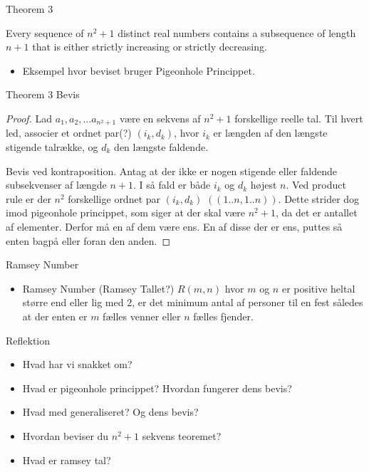\documentclass{beamer}
\begin{document}
\begin{frame}{Theorem 3}
   \begin{theorem}
       Every sequence of $n^2 + 1$ distinct real numbers contains a subsequence of length $n+1$ that is either strictly increasing or strictly decreasing. 
   \end{theorem} 
   \begin{itemize}
       \item Eksempel hvor beviset bruger Pigeonhole Princippet.
   \end{itemize}
\end{frame}

\begin{frame}{Theorem 3 Bevis}
   \begin{proof}
       Lad $a_1, a_2, \ldots a_{n^2+1}$ være en sekvens af $n^2 + 1$ forskellige reelle tal. Til hvert led, associer et ordnet par(?) $(i_k, d_k)$, hvor $i_k$ er længden af den længste stigende talrække, og $d_k$ den længste faldende. 

       Bevis ved kontraposition. Antag at der ikke er nogen stigende eller faldende subsekvenser af længde $n+1$. I så fald er både $i_k$ og $d_k$ højest $n$. Ved product rule er der $n^2$ forskellige ordnet par $(i_k, d_k)$ $((1..n, 1..n))$. Dette strider dog imod pigeonhole princippet, som siger at der skal være $n^2 + 1$, da det er antallet af elementer. Derfor må en af dem være ens. En af disse der er ens, puttes så enten bagpå eller foran den anden. 
   \end{proof} 
\end{frame}

\begin{frame}{Ramsey Number}
    \begin{itemize}
        \item Ramsey Number (Ramsey Tallet?) $R(m,n)$ hvor $m$ og $n$ er positive heltal større end eller lig med 2, er det minimum antal af personer til en fest således at der enten er $m$ fælles venner eller $n$ fælles fjender. 
    \end{itemize}
\end{frame}

\begin{frame}{Reflektion}
\begin{itemize}
    \item Hvad har vi snakket om? 
    \item Hvad er pigeonhole princippet? Hvordan fungerer dens bevis? 
    \item Hvad med generaliseret? Og dens bevis? 
\item Hvordan beviser du $n^2 + 1$ sekvens teoremet? 
\item Hvad er ramsey tal?
\end{itemize}
\end{frame}
\end{document}
